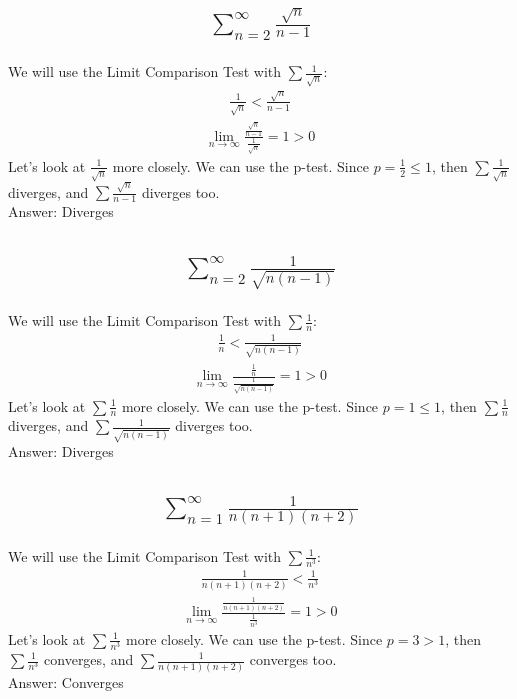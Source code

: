 \documentclass{article}
\begin{document}
\subsection{
	\begin{align*}
		\sum_{n = 2}^\infty \frac{\sqrt{n}}{n - 1}
	\end{align*}
}
We will use the Limit Comparison Test with $\sum \frac{1}{\sqrt{n}}$:
\begin{align*}
	\frac{1}{\sqrt{n}} < \frac{\sqrt{n}}{n - 1}
\end{align*}
\begin{align*}
	\lim_{n \to \infty} {\frac{\frac{\sqrt{n}}{n - 1}}{\frac{1}{\sqrt{n}}}} = 1 > 0
\end{align*}
Let's look at $\frac{1}{\sqrt{n}}$ more closely. We can use the p-test. Since $p = \frac{1}{2} \leq 1$, then $\sum \frac{1}{\sqrt{n}}$ diverges, and $\sum \frac{\sqrt{n}}{n - 1}$ diverges too. \\[10pt] 
Answer: Diverges

\subsection{
	\begin{align*}
		\sum_{n = 2}^\infty \frac{1}{\sqrt{n(n - 1)}}
	\end{align*}
}
We will use the Limit Comparison Test with $\sum \frac{1}{n}$:
\begin{align*}
	\frac{1}{n} < \frac{1}{\sqrt{n(n - 1)}}
\end{align*}
\begin{align*}
	\lim_{n \to \infty} {\frac{\frac{1}{n}}{\frac{1}{\sqrt{n(n - 1)}}}} = 1 > 0
\end{align*}
Let's look at $\sum \frac{1}{n}$ more closely. We can use the p-test. Since $p = 1 \leq 1$, then $\sum \frac{1}{n}$ diverges, and $\sum \frac{1}{\sqrt{n(n - 1)}}$ diverges too. \\[10pt]
Answer: Diverges

\subsection{
	\begin{align*}
		\sum_{n = 1}^\infty \frac{1}{n(n + 1)(n + 2)}
	\end{align*}
}
We will use the Limit Comparison Test with $\sum \frac{1}{n^3}$:
\begin{align*}
	\frac{1}{n(n + 1)(n + 2)} < \frac{1}{n^3}
\end{align*}
\begin{align*}
	\lim_{n \to \infty} {\frac{\frac{1}{n(n + 1)(n + 2)}}{\frac{1}{n^3}}} = 1 > 0
\end{align*}
Let's look at $\sum \frac{1}{n^3}$ more closely. We can use the p-test. Since $p = 3 > 1$, then $\sum \frac{1}{n^3}$ converges, and $\sum \frac{1}{n(n + 1)(n + 2)}$ converges too. \\[10pt]
Answer: Converges
\end{document}
